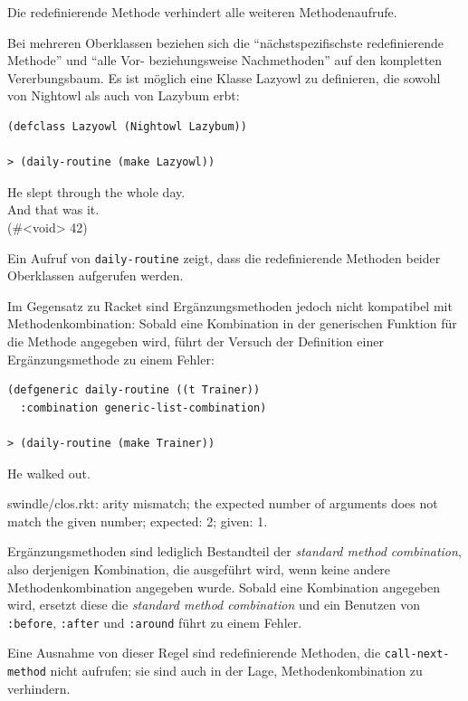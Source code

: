 Die redefinierende Methode verhindert alle weiteren Methodenaufrufe. 

Bei mehreren Oberklassen beziehen sich die ``nächstspezifischste redefinierende Methode'' und ``alle Vor- beziehungsweise Nachmethoden'' auf den kompletten Vererbungsbaum. Es ist möglich eine Klasse Lazyowl zu definieren, die sowohl von Nightowl als auch von Lazybum erbt:

\begin{lstlisting}
(defclass Lazyowl (Nightowl Lazybum))

> (daily-routine (make Lazyowl))
\end{lstlisting}
{\routput He slept through the whole day.\\
\phantom{.}And that was it.\\
\phantom{.}(\#<void> 42)}

Ein Aufruf von \texttt{daily-routine} zeigt, dass die redefinierende Methoden beider Oberklassen aufgerufen werden. 

Im Gegensatz zu Racket sind Ergänzungsmethoden jedoch nicht kompatibel mit Methodenkombination: Sobald eine Kombination in der generischen Funktion für die Methode angegeben wird, führt der Versuch der Definition einer Ergänzungsmethode zu einem Fehler:

\begin{lstlisting}
(defgeneric daily-routine ((t Trainer))
  :combination generic-list-combination)
  
> (daily-routine (make Trainer))
\end{lstlisting}
{\routput He walked out.}

\vspace{-0.3cm}
{\rerror swindle/clos.rkt: arity mismatch; the expected number of arguments does not match the given number; expected: 2; given: 1.}

Ergänzungsmethoden sind lediglich Bestandteil der \emph{standard method combination}, also derjenigen Kombination, die ausgeführt wird, wenn keine andere Methodenkombination angegeben wurde. Sobald eine Kombination angegeben wird, ersetzt diese die \textit{standard method combination} und ein Benutzen von \texttt{:before}, \texttt{:after} und \texttt{:around} führt zu einem Fehler.

Eine Ausnahme von dieser Regel sind redefinierende Methoden, die \texttt{call-next-method} nicht aufrufen; sie sind auch in der Lage, Methodenkombination zu verhindern.

